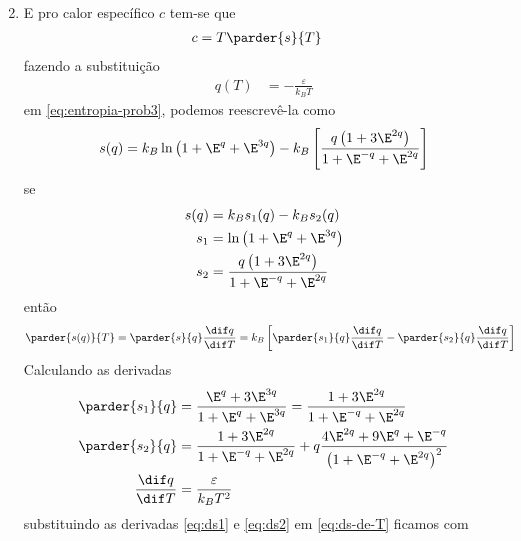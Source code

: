 \begin{prob}
\begin{sol}
\begin{enumerate}[label=\alph *)]
\begin{align}
{\begin{gathered}
          \end{gathered}
        }
      \end{align}
      \item E pro calor específico $c$ tem-se que
      \begin{align}
        c&=T\parder{s}{T}
      \end{align}
      fazendo a substituição
      \begin{align}
        q(T)&=-\frac{\varepsilon}{k_BT}
      \end{align}
      em \eqref{eq:entropia-prob3}, podemos reescrevê-la como
      \begin{align}
        s(q)=k_B\ln\left(1+\E^{q}+\E^{3q}\right)-k_B\left[\frac{q\left(1+3\E^{2q}\right)}{1+\E^{-q}+\E^{2q}}\right]
      \end{align}
      se
      \begin{subequations}
        \begin{align}
          s(q)&=k_Bs_1(q)-k_Bs_2(q)\label{eq:sq}\\
          s_1&=\ln\left(1+\E^q+\E^{3q}\right)\label{eq:s1}\\
          s_2&=\frac{q\left(1+3\E^{2q}\right)}{1+\E^{-q}+\E^{2q}}\label{eq:s2}
        \end{align}
      \end{subequations}
      então
      \begin{align}
        \parder{s(q)}{T}&=\parder{s}{q}\frac{\dif q}{\dif T}=k_B\left[\parder{s_1}{q}\frac{\dif q}{\dif T}-\parder{s_2}{q}\frac{\dif q}{\dif T}\right]\label{eq:ds-de-T}
      \end{align}
      Calculando as derivadas
      \begin{subequations}
        \begin{align}
          \parder{s_1}{q}&=\frac{\E^q+3\E^{3q}}{1+\E^{q}+\E^{3q}}=\frac{1+3\E^{2q}}{1+\E^{-q}+\E^{2q}}\label{eq:ds1}\\
          \parder{s_2}{q}&=\frac{1+3\E^{2q}}{1+\E^{-q}+\E^{2q}}+q\frac{4\E^{2q}+9\E^{q}+\E^{-q}}{\left(1+\E^{-q}+\E^{2q}\right)^2}\label{eq:ds2}\\
          \frac{\dif q}{\dif T}&=\frac{\varepsilon}{k_BT^2}\label{eq:dq-de-T}
        \end{align}
      \end{subequations}
      substituindo as derivadas \eqref{eq:ds1} e \eqref{eq:ds2} em \eqref{eq:ds-de-T} ficamos com
      \begin{align}
        \begin{split}

\end{split}
\end{align}
\end{enumerate}
\end{sol}
\end{prob}
